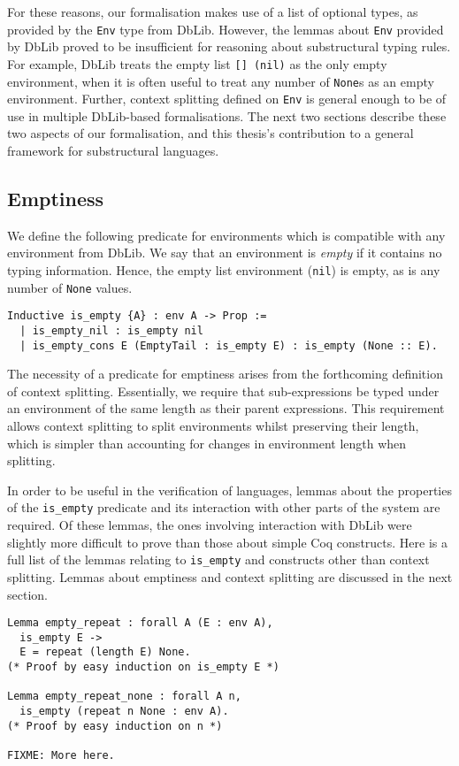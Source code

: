 \documentclass[]{unswthesis}
\let\c\texttt
\let\i\textit
\begin{document}
For these reasons, our formalisation makes use of a list of optional types, as provided by the \c{Env} type from DbLib. However, the lemmas about \c{Env} provided by DbLib proved to be insufficient for reasoning about substructural typing rules. For example, DbLib treats the empty list \c{[] (nil)} as the only empty environment, when it is often useful to treat any number of \c{None}s as an empty environment. Further, context splitting defined on \c{Env} is general enough to be of use in multiple DbLib-based formalisations. The next two sections describe these two aspects of our formalisation, and this thesis's contribution to a general framework for substructural languages.

\subsection{Emptiness}

We define the following predicate for environments which is compatible with any environment from DbLib. We say that an environment is \i{empty} if it contains no typing information. Hence, the empty list environment (\c{nil}) is empty, as is any number of \c{None} values.

\begin{verbatim}
Inductive is_empty {A} : env A -> Prop :=
  | is_empty_nil : is_empty nil
  | is_empty_cons E (EmptyTail : is_empty E) : is_empty (None :: E).
\end{verbatim}

The necessity of a predicate for emptiness arises from the forthcoming definition of context splitting. Essentially, we require that sub-expressions be typed under an environment of the same length as their parent expressions. This requirement allows context splitting to split environments whilst preserving their length, which is simpler than accounting for changes in environment length when splitting.

In order to be useful in the verification of languages, lemmas about the properties of the \c{is_empty} predicate and its interaction with other parts of the system are required. Of these lemmas, the ones involving interaction with DbLib were slightly more difficult to prove than those about simple Coq constructs. Here is a full list of the lemmas relating to \c{is_empty} and constructs other than context splitting. Lemmas about emptiness and context splitting are discussed in the next section.

\begin{verbatim}
Lemma empty_repeat : forall A (E : env A),
  is_empty E ->
  E = repeat (length E) None.
(* Proof by easy induction on is_empty E *)

Lemma empty_repeat_none : forall A n,
  is_empty (repeat n None : env A).
(* Proof by easy induction on n *)

FIXME: More here.
\end{verbatim}
\end{document}
